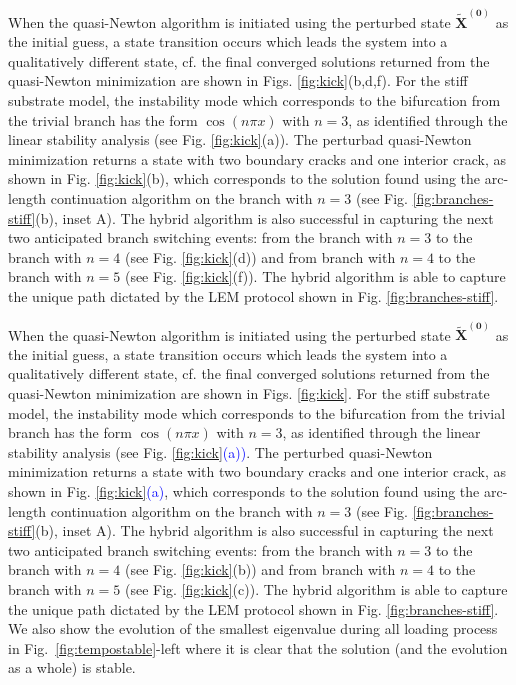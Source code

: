 When the quasi-Newton algorithm is initiated using the perturbed state \(\mathbf{\tilde X^{(0)}}\)
as the initial guess, {a state transition} occurs which leads the system into a qualitatively different state, cf. the final  converged solutions returned from the quasi-Newton minimization are shown in Figs. \ref{fig:kick}(b,d,f). For the stiff substrate model, the {instability mode} which corresponds to the bifurcation from the trivial branch has the form \(\cos(n\pi x)\) with \(n=3\), as identified through the linear stability analysis (see Fig. \ref{fig:kick}(a)). 
The perturbad quasi-Newton minimization returns a state with two boundary cracks and one interior crack, as shown in Fig. \ref{fig:kick}(b), which corresponds to the solution found using the arc-length continuation algorithm on the branch with \(n=3\) (see Fig. \ref{fig:branches-stiff}(b), inset A).  The hybrid algorithm is also successful in capturing the next two anticipated branch   switching events: from the  branch with \(n=3\)  to the branch  with \(n=4\) (see Fig. \ref{fig:kick}(d)) and  from branch with \(n=4\)  to the branch  with \(n=5\) (see Fig. \ref{fig:kick}(f)). The hybrid algorithm is able to capture the unique path dictated by the LEM protocol shown in Fig. \ref{fig:branches-stiff}.   

When the quasi-Newton algorithm is initiated using the perturbed state \(\mathbf{\tilde X^{(0)}}\) as the initial guess, {a state transition} occurs which leads the system into a qualitatively different state, cf. the final  converged solutions returned from the quasi-Newton minimization are shown in  Figs. \ref{fig:kick}. For the stiff substrate model, the {instability mode} which corresponds to the bifurcation from the trivial branch has the form \(\cos(n\pi x)\) with \(n=3\), as identified through the linear stability analysis (see Fig. \textcolor{blue}{\ref{fig:kick}(a))}. 
The {perturbed} quasi-Newton minimization returns a state with two boundary cracks and one interior crack, as shown in Fig. \textcolor{blue}{\ref{fig:kick}(a)}, which corresponds to the solution found using the arc-length continuation algorithm on the branch with \(n=3\) (see Fig. \ref{fig:branches-stiff}(b), inset A).  The hybrid algorithm is also successful in capturing the next two anticipated branch   switching events: from the  branch with \(n=3\)  to the branch  with \(n=4\) {(see Fig. \ref{fig:kick}(b))} and  from branch with \(n=4\)  to the branch  with \(n=5\)  {(see Fig. \ref{fig:kick}(c))}. The hybrid algorithm is able to capture the unique path dictated by the LEM protocol shown in Fig. \ref{fig:branches-stiff}. {We also show the evolution of the smallest eigenvalue during all loading process in Fig.~\ref{fig:tempostable}-left where  it is clear that  the solution (and the evolution as a whole) is stable.}

